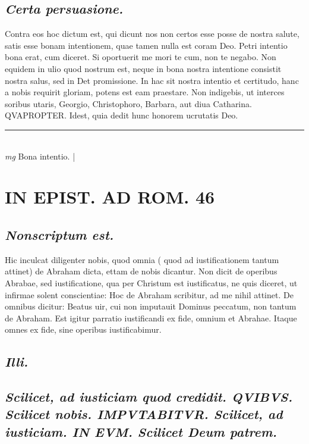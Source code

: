 \documentclass{article}
\begin{document}
\begin{pages}
\subsection*{\textit{Certa persuasione. }}\pstart Contra eos hoc dictum est, qui dicunt nos non certos esse posse de nostra salute, satis esse bonam intentionem, quae tamen nulla est coram Deo. Petri intentio bona erat, cum diceret. Si oportuerit me mori te cum, non te negabo. Non equidem in ulio quod nostrum est, neque in bona nostra intentione consistit nostra salus, sed in Det promissione. In hac sit nostra intentio et certitudo, hanc a nobis requirit gloriam, potens est eam praestare. Non indigebis, ut interces soribus utaris, Georgio, Christophoro, Barbara, aut diua Catharina. QVAPROPTER. Idest, quia dedit hunc honorem ucrutatis Deo.   \pend
\vspace{0.5cm}\noindent
\vspace{0.2cm}\rule{1cm}{0.2pt}\\ 
\hspace{0.2cm}\textit{mg}
\footnotesize Bona intentio. 
\normalsize| 
\section*{IN EPIST. AD ROM.  46 }
\marginpar{[ p.]}
{}
\subsection*{\textit{Nonscriptum est. }}\pstart Hic inculcat diligenter nobis, quod omnia ( quod ad iustificationem tantum attinet) de Abraham dicta, ettam de nobis dicantur. Non dicit de operibus Abrabae, sed iustificatione, qua per Christum est iustificatus, ne quis diceret, ut infirmae solent conscientiae: Hoc de Abraham scribitur, ad me nihil attinet. De omnibus dicitur: Beatus uir, cui non imputauit Dominus peccatum, non tantum de Abraham. Est igitur parratio iustificandi ex fide, omnium et Abrahae. Itaque  omnes ex fide, sine operibus iustificabimur.   \pend
{}
{}
\subsection*{\textit{Illi. }}
{}
\subsection*{\textit{Scilicet, ad iusticiam quod credidit. QVIBVS.  Scilicet nobis. IMPVTABITVR. Scilicet, ad iusticiam. IN EVM. Scilicet Deum patrem.  }}
{}

\end{pages}
\end{document}
